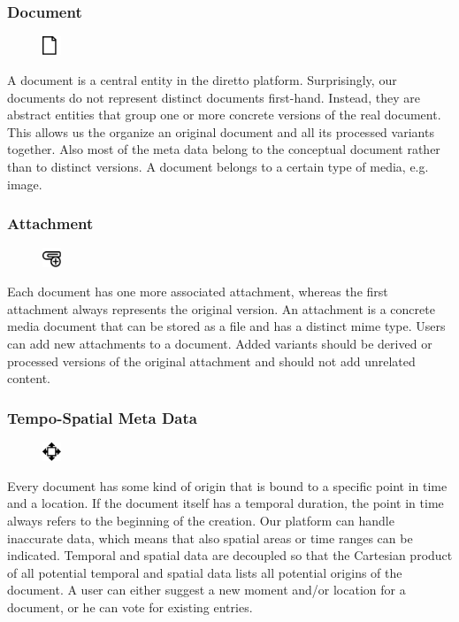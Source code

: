 \documentclass[10pt]{article}
\begin{document}
\subsubsection{Document}
\begin{figure}
\includegraphics[width=0.05\textwidth]{symbols/document_generic.pdf}
\end{figure}
 A document is a central entity in the diretto platform. Surprisingly, our documents do not represent distinct documents first-hand. Instead, they are abstract entities that group one or more concrete versions of the real document. This allows us the organize an original document and all its processed variants together. Also most of the meta data belong to the conceptual document rather than to distinct versions. A document belongs to a certain type of media, e.g. image.  

\subsubsection{Attachment} 
\begin{figure}
\includegraphics[width=0.05\textwidth]{symbols/attachment_add.pdf}
\end{figure}
Each document has one more associated attachment, whereas the first attachment always represents the original version. An attachment is a concrete media document that can be stored as a file and has a distinct mime type. Users can add new attachments to a document. Added variants should be derived or processed versions of the original attachment and should not add unrelated content.

\subsubsection{Tempo-Spatial Meta Data} 
\begin{figure}
\includegraphics[width=0.05\textwidth]{symbols/symbol_change_location.pdf}
\end{figure}
Every document has some kind of origin that is bound to a specific point in time and a location. If the document itself has a temporal duration, the point in time always refers to the beginning of the creation. Our platform can handle inaccurate data, which means that also spatial areas or time ranges can be indicated. Temporal and spatial data are decoupled so that the Cartesian product of all potential temporal and spatial data lists all potential origins of the document. A user can either suggest a new moment and/or location for a document, or he can vote for existing entries. 
\end{document}
